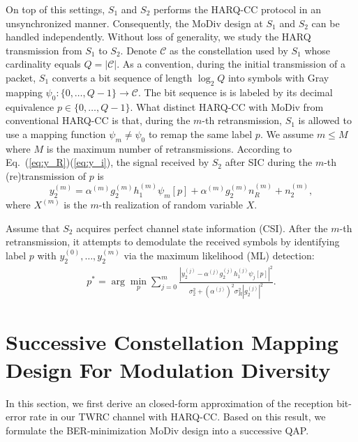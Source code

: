 \documentclass{article}
\begin{document}
On top of this settings, $S_1$ and $S_2$ performs the HARQ-CC protocol
in an unsynchronized manner. Consequently, the MoDiv design at $S_1$ and $S_2$
can be handled independently. Without loss of generality, we study the HARQ
transmission from $S_1$ to $S_2$. Denote $\mathcal{C}$ as the constellation used
by $S_1$ whose cardinality equals $Q=|\mathcal{C}|$. As a convention, during the
initial transmission of a packet, $S_1$ converts a bit sequence of length
$\log_2Q$ into symbols with Gray mapping $\psi_0:\{0,\ldots,Q - 1\}\rightarrow
\mathcal{C}$. The bit sequence is is labeled by its decimal equivalence $p\in
\{0,\ldots,Q - 1\}$. What distinct HARQ-CC with MoDiv from conventional HARQ-CC
is that, during the $m$-th retransmission, $S_1$ is allowed to use a
mapping function $\psi_m\not=\psi_0$ to remap the same label $p$. We assume
$m \leq M$ where $M$ is the maximum number of retransmissions. According to
Eq.~(\ref{eq:y_R})(\ref{eq:y_i}), the signal received by $S_2$ after SIC during
the $m$-th (re)transmission of $p$ is
\begin{equation}
  y_2^{(m)} = \alpha^{(m)} g_2^{(m)}h_1^{(m)}\psi_m[p] +
  \alpha^{(m)} g_2^{(m)}n_R^{(m)} + n_2^{(m)},
\end{equation}
where $X^{(m)}$ is the $m$-th realization of random variable $X$.

Assume that $S_2$ acquires perfect channel state information
(CSI). After the $m$-th retransmission, it attempts to demodulate the received symbols by
identifying label $p$ with $y_2^{(0)},\ldots,y_2^{(m)}$ via the maximum
likelihood (ML) detection:
\begin{align}
  p^* = \arg\min_p\sum_{j=0}^{m} \frac{|y_2^{(j)} -
  \alpha^{(j)} g_2^{(j)} h_1^{(j)}\psi_j[p]|^2}
  {\sigma_2^2+(\alpha^{(j)})^2\sigma_R^2|g_2^{(j)}|^2}.
  \label{eq:ml}
\end{align}

\section{Successive Constellation Mapping Design For Modulation Diversity}
\label{sec:modiv}
In this section, we first derive an closed-form approximation of
the reception bit-error rate in our TWRC channel with HARQ-CC. Based on this
result, we formulate the BER-minimization MoDiv design into a successive
QAP.
\end{document}
